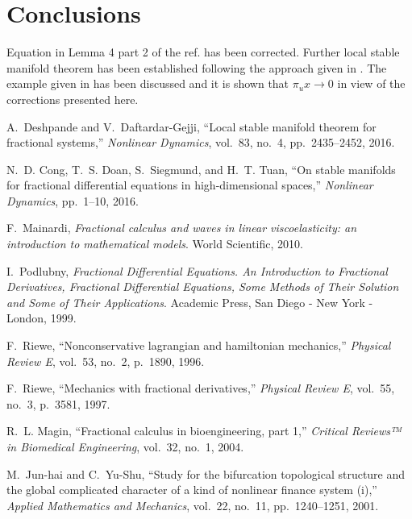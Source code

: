 \section{Conclusions}
	Equation in Lemma 4 part 2 of the ref. \cite{deshpande2016local} has been corrected. Further local stable manifold theorem has been established following the approach given in \cite{deshpande2016local}. The example given in \cite{cong2016stable} has been discussed and it is shown that $\pi_u x \rightarrow 0$ in view of the corrections presented here. 
 	
	\begin{thebibliography}{10}
		
		A.~Deshpande and V.~Daftardar-Gejji, ``Local stable manifold theorem for
		fractional systems,'' {\em Nonlinear Dynamics}, vol.~83, no.~4,
		pp.~2435--2452, 2016.
		
		N.~D. Cong, T.~S. Doan, S.~Siegmund, and H.~T. Tuan, ``On stable manifolds for
		fractional differential equations in high-dimensional spaces,'' {\em
			Nonlinear Dynamics}, pp.~1--10, 2016.
		
		F.~Mainardi, {\em Fractional calculus and waves in linear viscoelasticity: an
			introduction to mathematical models}.
		\newblock World Scientific, 2010.
		
		I.~Podlubny, {\em Fractional Differential Equations. An Introduction to
			Fractional Derivatives, Fractional Differential Equations, Some Methods of
			Their Solution and Some of Their Applications}.
		\newblock Academic Press, San Diego - New York - London, 1999.
		
		F.~Riewe, ``Nonconservative lagrangian and hamiltonian mechanics,'' {\em
			Physical Review E}, vol.~53, no.~2, p.~1890, 1996.
		
		F.~Riewe, ``Mechanics with fractional derivatives,'' {\em Physical Review E},
		vol.~55, no.~3, p.~3581, 1997.
		
		R.~L. Magin, ``Fractional calculus in bioengineering, part 1,'' {\em Critical
			Reviews™ in Biomedical Engineering}, vol.~32, no.~1, 2004.
		
		M.~Jun-hai and C.~Yu-Shu, ``Study for the bifurcation topological structure and
		the global complicated character of a kind of nonlinear finance system (i),''
		{\em Applied Mathematics and Mechanics}, vol.~22, no.~11, pp.~1240--1251,
		2001.
		

\end{thebibliography}
